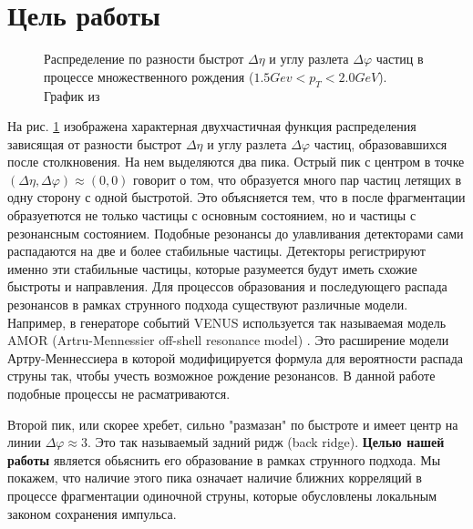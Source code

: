 \documentclass[12pt]{article}
\renewcommand{\phi}{\varphi}
\begin{document}
\section{Цель работы}
\begin{figure}
\caption{Распределение по разности быстрот $\Delta \eta$ и углу разлета $\Delta \phi$ частиц в процессе множественного рождения ($1.5 Gev < p_T < 2.0 GeV$). График из \cite{exp_data}}
\label{main}
\end{figure}

\qquad На рис. \ref{main} изображена характерная двухчастичная функция распределения зависящая от разности быстрот $\Delta \eta$ и углу разлета $\Delta \phi$ частиц, образовавшихся после столкновения. На нем выделяются два пика. Острый пик с центром в точке $(\Delta \eta, \Delta \phi) \approx (0, 0)$ говорит о том, что образуется много пар частиц летящих в одну сторону с одной быстротой. Это объясняется тем, что в после фрагментации образуетются не только частицы с основным состоянием, но и частицы с резонансным состоянием. Подобные резонансы до улавливания детекторами сами распадаются на две и более стабильные частицы. Детекторы регистрируют именно эти стабильные частицы, которые разумеется будут иметь схожие быстроты и направления. Для процессов образования и последующего распада резонансов в рамках струнного подхода существуют различные модели. Например, в генераторе событий VENUS используется так называемая модель AMOR (Artru-Mennessier off-shell resonance model) \cite{venus}. Это расширение модели Артру-Меннессиера в которой модифицируется формула для вероятности распада струны так, чтобы учесть возможное рождение резонансов. В данной работе подобные процессы не расматриваются. 

Второй пик, или скорее хребет, сильно "размазан" по быстроте и имеет центр на линии $\Delta \phi \approx 3$. Это так называемый задний ридж (back ridge). 
\textbf{Целью нашей работы} является обьяснить его образование в рамках струнного подхода. Мы покажем, что наличие этого пика означает наличие ближних корреляций в процессе фрагментации одиночной струны, которые обусловлены локальным законом сохранения импульса.
\end{document}
